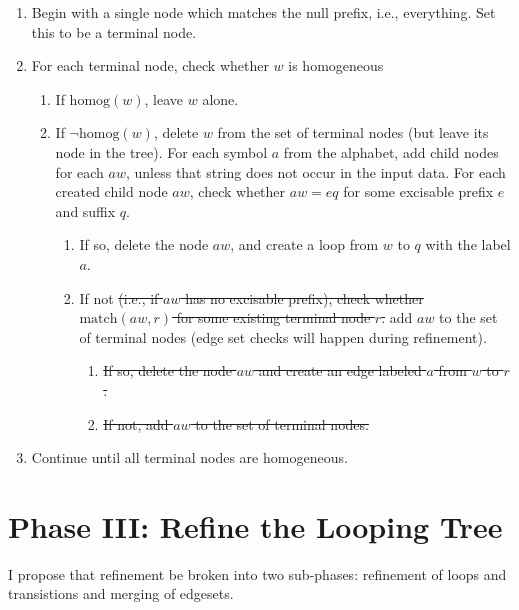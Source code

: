 \documentclass{article}
\newcommand{\match}{\ensuremath{\mathrm{match}}}
\newcommand{\homog}{\ensuremath{\mathrm{homog}}}
\begin{document}
\begin{leftbar}
\begin{enumerate}
\item Begin with a single node which matches the null prefix, i.e., everything.
  Set this to be a terminal node.
\item For each terminal node, check whether $w$ is homogeneous
  \begin{enumerate}
  \item If $\homog(w)$, leave $w$ alone.
  \item If $\neg\homog(w)$, delete $w$ from the set of terminal nodes (but
    leave its node in the tree).  For each symbol $a$ from the alphabet, add
    child nodes for each $aw$, unless that string does not occur in the input
    data.  For each created child node $aw$, check whether $aw=eq$ for some
    excisable prefix $e$ and suffix $q$.
    \begin{enumerate}
    \item If so, delete the node $aw$, and create a loop from $w$ to $q$ with
      the label $a$.
    \item If not \sout{(i.e., if $aw$ has no excisable prefix), check whether
      $\match(aw,r)$ for some existing terminal node $r$.} add $aw$ to the set
      of terminal nodes (edge set checks will happen during refinement).
      \begin{enumerate}
      \item \sout{If so, delete the node $aw$ and create an edge labeled $a$ from $w$
        to $r$.}
      \item \sout{If not, add $aw$ to the set of terminal nodes.}
      \end{enumerate}
    \end{enumerate}
  \end{enumerate}
\item Continue until all terminal nodes are homogeneous.
\end{enumerate}
\end{leftbar}


\section{Phase III: Refine the Looping Tree}

I propose that refinement be broken into two sub-phases: refinement of
loops and transistions and merging of edgesets.
\end{document}
